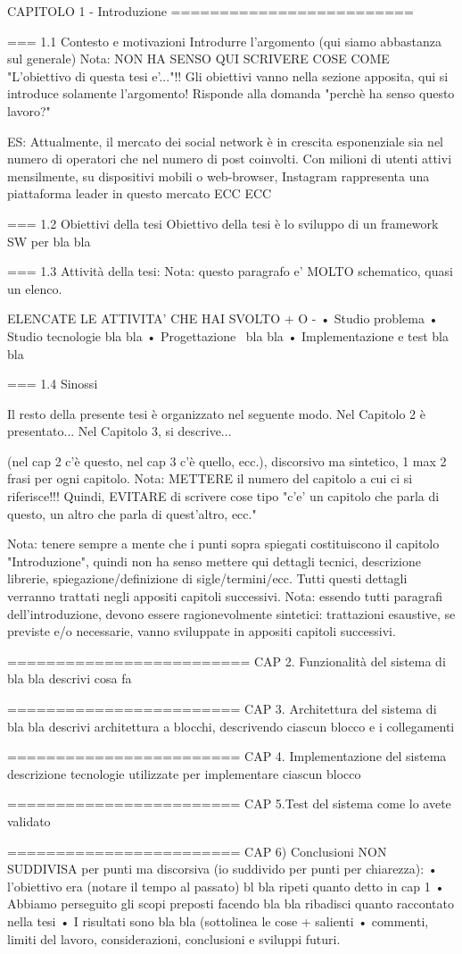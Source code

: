 CAPITOLO 1 - Introduzione
=========================

=== 1.1 Contesto e motivazioni
Introdurre l'argomento (qui siamo abbastanza sul generale)
Nota: NON HA SENSO QUI SCRIVERE COSE COME "L'obiettivo di questa tesi e'..."!! Gli obiettivi vanno nella sezione apposita, qui si introduce solamente l'argomento! Risponde alla domanda "perchè ha senso questo lavoro?"

ES: Attualmente, il mercato dei social network è in crescita esponenziale sia nel numero di operatori che nel numero di post coinvolti.   Con milioni di utenti attivi mensilmente, su dispositivi mobili o web-browser, Instagram rappresenta una piattaforma leader in questo mercato ECC ECC


=== 1.2 Obiettivi della tesi
Obiettivo della tesi è lo sviluppo di un framework SW per bla bla

=== 1.3 Attività della tesi:
Nota: questo paragrafo e' MOLTO schematico, quasi un elenco.

ELENCATE LE ATTIVITA' CHE HAI SVOLTO + O -
•	Studio problema
•	Studio tecnologie bla bla
•	Progettazione  bla bla
•	Implementazione e test bla bla

=== 1.4 Sinossi

Il resto della presente tesi è organizzato nel seguente modo. Nel Capitolo 2 è presentato... Nel Capitolo 3, si descrive...

(nel cap 2 c'è questo, nel cap 3 c'è quello, ecc.), discorsivo ma sintetico, 1 max 2 frasi per ogni capitolo. Nota: METTERE il numero del capitolo a cui ci si riferisce!!! Quindi, EVITARE di scrivere cose tipo "c'e' un capitolo che parla di questo, un altro che parla di quest'altro, ecc."

Nota: tenere sempre a mente che i punti sopra spiegati costituiscono il capitolo "Introduzione", quindi non ha senso mettere qui dettagli tecnici, descrizione librerie, spiegazione/definizione di sigle/termini/ecc. Tutti questi dettagli verranno trattati negli appositi capitoli successivi. Nota: essendo tutti paragrafi dell'introduzione, devono essere ragionevolmente sintetici: trattazioni esaustive, se previste e/o necessarie, vanno sviluppate in appositi capitoli
successivi.

=========================
CAP 2. Funzionalità del sistema di bla bla
descrivi cosa fa

========================
CAP 3. Architettura del sistema di bla bla
descrivi architettura a blocchi, descrivendo ciascun blocco e i collegamenti

========================
CAP 4. Implementazione del sistema
descrizione tecnologie utilizzate per implementare ciascun blocco

========================
CAP 5.Test del sistema
come lo avete validato

========================
CAP 6) Conclusioni
NON SUDDIVISA per punti ma discorsiva (io suddivido per punti per chiarezza):
•	l'obiettivo era (notare il tempo al passato) bl bla ripeti quanto detto in cap 1
•	Abbiamo perseguito gli scopi preposti facendo bla bla ribadisci quanto raccontato nella tesi
•	I risultati sono bla bla (sottolinea le cose + salienti
•	commenti, limiti del lavoro, considerazioni, conclusioni e sviluppi futuri.
